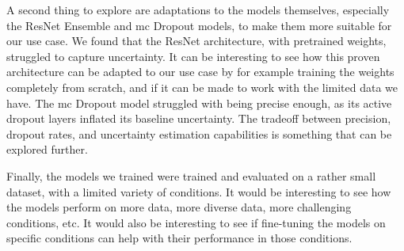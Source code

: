 A second thing to explore are adaptations to the models themselves, especially the ResNet Ensemble and \gls{mc} Dropout models, to make them more suitable for our use case.
We found that the ResNet architecture, with pretrained weights, struggled to capture uncertainty.
It can be interesting to see how this proven architecture can be adapted to our use case by for example training the weights completely from scratch, and if it can be made to work with the limited data we have.
The \gls{mc} Dropout model struggled with being precise enough, as its active dropout layers inflated its baseline uncertainty.
The tradeoff between precision, dropout rates, and uncertainty estimation capabilities is something that can be explored further.

Finally, the models we trained were trained and evaluated on a rather small dataset, with a limited variety of conditions.
It would be interesting to see how the models perform on more data, more diverse data, more challenging conditions, etc.
It would also be interesting to see if fine-tuning the models on specific conditions can help with their performance in those conditions.